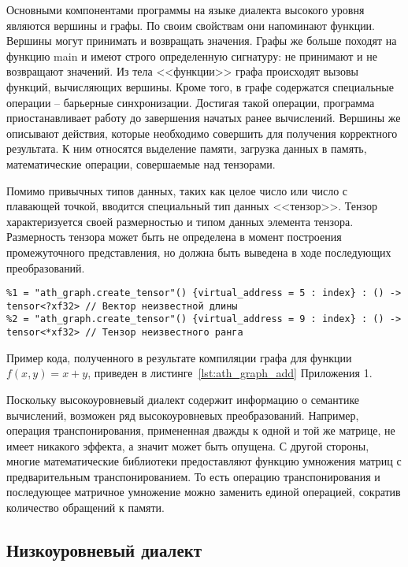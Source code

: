 Основными компонентами программы на языке диалекта высокого уровня являются
вершины и графы. По своим свойствам они напоминают функции. Вершины могут 
принимать и возвращать значения. Графы же больше походят на функцию main и 
имеют строго определенную сигнатуру: не принимают и не возвращают значений.
Из тела <<функции>> графа происходят вызовы функций, вычисляющих вершины.
Кроме того, в графе содержатся специальные операции -- барьерные синхронизации.
Достигая такой операции, программа приостанавливает работу до завершения
начатых ранее вычислений. Вершины же описывают действия, которые необходимо
совершить для получения корректного результата. К ним относятся выделение памяти,
загрузка данных в память, математические операции, совершаемые над тензорами.

Помимо привычных типов данных, таких как целое число или число с плавающей
точкой, вводится специальный тип данных <<тензор>>. Тензор характеризуется
своей размерностью и типом данных элемента тензора. Размерность тензора может
быть не определена в момент построения промежуточного представления, но должна
быть выведена в ходе последующих преобразований.

\begin{lstlisting}[language=athgraph,caption=Различные варианты тензоров]
%0 = "ath_graph.create_tensor"() {virtual_address = 1 : index} : () -> tensor<2x2xf32> // Матрица 2x2
%1 = "ath_graph.create_tensor"() {virtual_address = 5 : index} : () -> tensor<?xf32> // Вектор неизвестной длины
%2 = "ath_graph.create_tensor"() {virtual_address = 9 : index} : () -> tensor<*xf32> // Тензор неизвестного ранга
\end{lstlisting}

Пример кода, полученного в результате компиляции графа для функции 
$f(x, y) = x + y$, приведен в листинге~\ref{lst:ath_graph_add} Приложения 1.

Поскольку высокоуровневый диалект содержит информацию о семантике вычислений,
возможен ряд высокоуровневых преобразований. Например, операция транспонирования,
примененная дважды к одной и той же матрице, не имеет никакого эффекта, а значит
может быть опущена. С другой стороны, многие математические библиотеки
предоставляют функцию умножения матриц с предварительным транспонированием.
То есть операцию транспонирования и последующее матричное умножение можно
заменить единой операцией, сократив количество обращений к памяти.

\subsection{Низкоуровневый диалект}


